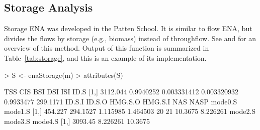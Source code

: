 \documentclass[article]{jss}
\begin{document}
\subsection{Storage Analysis}
Storage ENA was developed in the Patten School.  It is similar to flow
ENA, but divides the flows by storage (e.g., biomass) instead of
throughflow.  See \citet{fath99_review} and \citet{schramski11} for an
overview of this method.  Output of this function is summarized in
Table~\ref{tab:storage}, and this is an example of its implementation.

\begin{Schunk}
\begin{Sinput}
> S <- enaStorage(m)
> attributes(S)
\end{Sinput}
\begin{Soutput}
          TSS       CIS         BSI         DSI       ISI     ID.S
[1,] 3112.044 0.9940252 0.003331412 0.003320932 0.9933477 299.1171
      ID.S.I   ID.S.O  HMG.S.O  HMG.S.I NAS NASP mode0.S  mode1.S
[1,] 454.227 294.1527 1.115985 1.464503  20   21 10.3675 8.226261
     mode2.S  mode3.S mode4.S
[1,] 3093.45 8.226261 10.3675
\end{Soutput}
\end{Schunk}
\end{document}
